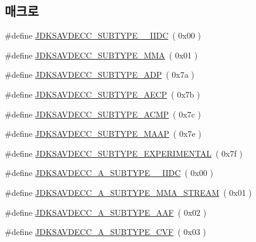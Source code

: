 \subsection*{매크로}
\begin{DoxyCompactItemize}
\item 
\#define \hyperlink{group__subtype_gaa2995e8b77554ccd4ea05f2acd5b6046}{J\+D\+K\+S\+A\+V\+D\+E\+C\+C\+\_\+\+S\+U\+B\+T\+Y\+P\+E\+\_\+\_\+\+I\+I\+DC}~( 0x00 )
\item 
\#define \hyperlink{group__subtype_gac5e8aaa761dcbfe590311c1a161bcdd8}{J\+D\+K\+S\+A\+V\+D\+E\+C\+C\+\_\+\+S\+U\+B\+T\+Y\+P\+E\+\_\+\+M\+MA}~( 0x01 )
\item 
\#define \hyperlink{group__subtype_gad332b6f1f3f41f705c04917256c26761}{J\+D\+K\+S\+A\+V\+D\+E\+C\+C\+\_\+\+S\+U\+B\+T\+Y\+P\+E\+\_\+\+A\+DP}~( 0x7a )
\item 
\#define \hyperlink{group__subtype_ga4f1d76227a738f442d15ebaf2253b6b3}{J\+D\+K\+S\+A\+V\+D\+E\+C\+C\+\_\+\+S\+U\+B\+T\+Y\+P\+E\+\_\+\+A\+E\+CP}~( 0x7b )
\item 
\#define \hyperlink{group__subtype_gadcdd50d34325df28c29ca6249a4c307e}{J\+D\+K\+S\+A\+V\+D\+E\+C\+C\+\_\+\+S\+U\+B\+T\+Y\+P\+E\+\_\+\+A\+C\+MP}~( 0x7c )
\item 
\#define \hyperlink{group__subtype_ga6bd4399df988fdf88bf7c405592f8484}{J\+D\+K\+S\+A\+V\+D\+E\+C\+C\+\_\+\+S\+U\+B\+T\+Y\+P\+E\+\_\+\+M\+A\+AP}~( 0x7e )
\item 
\#define \hyperlink{group__subtype_ga048893df07c2fb15ede7f4de9d192c92}{J\+D\+K\+S\+A\+V\+D\+E\+C\+C\+\_\+\+S\+U\+B\+T\+Y\+P\+E\+\_\+\+E\+X\+P\+E\+R\+I\+M\+E\+N\+T\+AL}~( 0x7f )
\item 
\#define \hyperlink{group__subtype_ga0d6f94b7b3e72a7877f89d2f88aedb7d}{J\+D\+K\+S\+A\+V\+D\+E\+C\+C\+\_\+A\+\_\+\+S\+U\+B\+T\+Y\+P\+E\+\_\+\_\+\+I\+I\+DC}~( 0x00 )
\item 
\#define \hyperlink{group__subtype_ga4297cc0b1b92af262ec7698a36ba22c9}{J\+D\+K\+S\+A\+V\+D\+E\+C\+C\+\_\+A\+\_\+\+S\+U\+B\+T\+Y\+P\+E\+\_\+\+M\+M\+A\+\_\+\+S\+T\+R\+E\+AM}~( 0x01 )
\item 
\#define \hyperlink{group__subtype_ga5634136ccce4a9829ebfc046806ef73f}{J\+D\+K\+S\+A\+V\+D\+E\+C\+C\+\_\+A\+\_\+\+S\+U\+B\+T\+Y\+P\+E\+\_\+\+A\+AF}~( 0x02 )
\item 
\#define \hyperlink{group__subtype_ga9a6d7b22a88a58547fdca619cf3eed02}{J\+D\+K\+S\+A\+V\+D\+E\+C\+C\+\_\+A\+\_\+\+S\+U\+B\+T\+Y\+P\+E\+\_\+\+C\+VF}~( 0x03 )
\item 

\end{DoxyCompactItemize}
